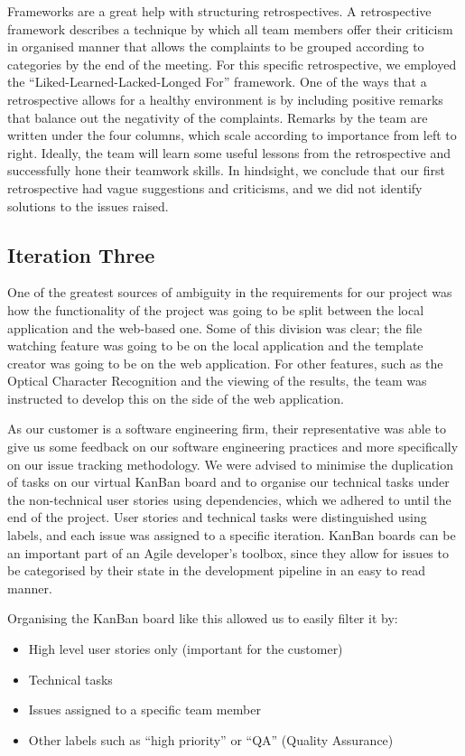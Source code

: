 \documentclass{l3proj}
\begin{document}
Frameworks are a great help with structuring retrospectives. A retrospective framework describes a technique by which all team members offer their criticism in organised manner that allows the complaints to be grouped according to categories by the end of the meeting. For this specific retrospective, we employed the ``Liked-Learned-Lacked-Longed For'' framework. One of the ways that a retrospective allows for a healthy environment is by including positive remarks that balance out the negativity of the complaints. Remarks by the team are written under the four columns, which scale according to importance from left to right. Ideally, the team will learn some useful lessons from the retrospective and successfully hone their teamwork skills. In hindsight, we conclude that our first retrospective had vague suggestions and criticisms, and we did not identify solutions to the issues raised.

\subsection{Iteration Three}

One of the greatest sources of ambiguity in the requirements for our project was how the functionality of the project was going to be split between the local application and the web-based one. Some of this division was clear; the file watching feature was going to be on the local application and the template creator was going to be on the web application. For other features, such as the Optical Character Recognition and the viewing of the results, the team was instructed to develop this on the side of the web application.

As our customer is a software engineering firm, their representative was able to give us some feedback on our software engineering practices and more specifically on our issue tracking methodology. We were advised to minimise the duplication of tasks on our virtual KanBan board and to organise our technical tasks under the non-technical user stories using dependencies, which we adhered to until the end of the project. User stories and technical tasks were distinguished using labels, and each issue was assigned to a specific iteration. KanBan boards can be an important part of an Agile developer’s toolbox, since they allow for issues to be categorised by their state in the development pipeline in an easy to read manner.

Organising the KanBan board like this allowed us to easily filter it by:
\begin{itemize}
\item High level user stories only (important for the customer)
\item Technical tasks
\item Issues assigned to a specific team member
\item Other labels such as ``high priority'' or ``QA'' (Quality Assurance)
\end{itemize}
\end{document}
